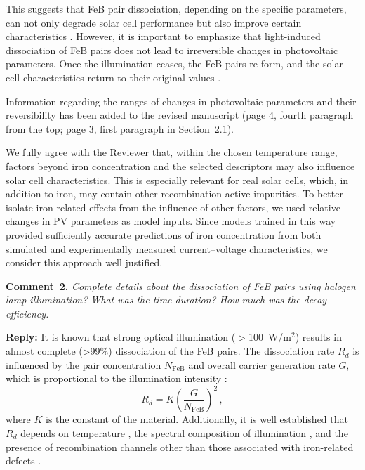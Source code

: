 \documentclass[a4paper,fleqn]{cas-sc}
\begin{document}
This suggests that FeB pair dissociation, depending on the specific parameters,
can not only degrade solar cell performance but also improve certain characteristics \cite{Olikh2025MSEB,FeB:Schmidt}.
However, it is important to emphasize that light-induced dissociation of FeB pairs does not lead to irreversible changes in photovoltaic parameters.
Once the illumination ceases, the FeB pairs re-form, and the solar cell characteristics return to their 
original values \cite{FeBLight2,FeBAssJAP2014,FeBKin2019,FeMethod2012,FeBLight2,FeBAssJAP2014}.


Information regarding the ranges of changes in photovoltaic parameters and their reversibility has been added to the revised manuscript
(page 4, fourth paragraph from the top; page 3, first paragraph in Section~2.1).

We fully agree with the Reviewer that, within the chosen temperature range,
factors beyond iron concentration and the selected descriptors may also influence solar cell characteristics.
This is especially relevant for real solar cells, which, in addition to iron,
may contain other recombination-active impurities.
To better isolate iron-related effects from the influence of other factors,
we used relative changes in PV parameters as model inputs.
Since models trained in this way provided sufficiently accurate predictions of iron concentration from
both simulated and experimentally measured current–voltage characteristics, we consider this approach well justified.


\vspace{1cm}
\noindent
\textcolor[rgb]{0.00,0.50,1.00}{\textbf{Comment~2.}}
\emph{Complete details about the dissociation of FeB pairs using halogen lamp illumination? What was the time duration? How much was the decay efficiency.}

\noindent
\textcolor[rgb]{0.51,0.00,0.00}{\textbf{Reply:}}
It is known \cite{Macdonald2004} that strong optical illumination ($>$100~W/m$^{2}$)
results in almost complete (>99\%) dissociation of the FeB pairs.
The dissociation rate $R_d$ is influenced by the pair concentration $N_\mathrm{FeB}$ and overall carrier generation rate $G$, which is proportional to the illumination intensity
\cite{FeBLight2,FeBAssJAP2014,FeBKin2019,FeMethod2012}:
\begin{equation}
\label{eqRd}
R_d=K\left(\frac{G}{N_\mathrm{FeB}}\right)^2\,,
\end{equation}
where
$K$ is the constant of the material.
Additionally, it is well established that $R_d$ depends on temperature \cite{Lagowskii1993,lauer2016},
the spectral composition of illumination \cite{OlikhPSSA},
and the presence of recombination channels other than those associated with iron-related defects \cite{FeBLight2,FeBAssJAP2014}.
\end{document}
